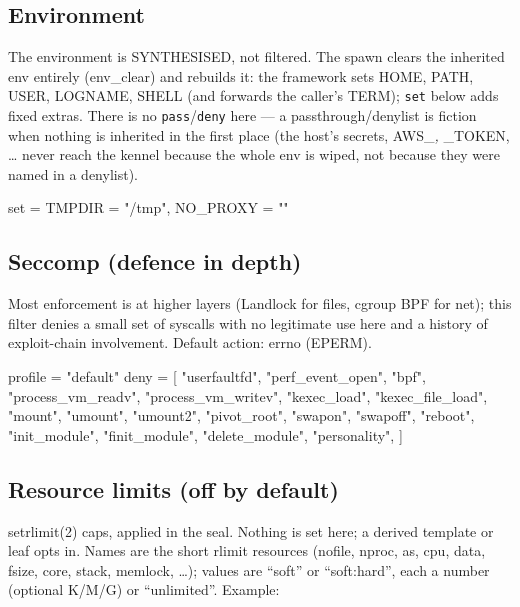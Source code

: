 \hypertarget{environment}{%
\subsection{Environment}\label{environment}}

The environment is SYNTHESISED, not filtered. The spawn clears the
inherited env entirely (env\_clear) and rebuilds it: the framework sets
HOME, PATH, USER, LOGNAME, SHELL (and forwards the caller's TERM);
\texttt{set} below adds fixed extras. There is no
\texttt{pass}/\texttt{deny} here --- a passthrough/denylist is fiction
when nothing is inherited in the first place (the host's secrets,
AWS\_\emph{, }\_TOKEN, \ldots{} never reach the kennel because the whole
env is wiped, not because they were named in a denylist).

\begin{kennelcode}
[env]
set = { TMPDIR = "/tmp", NO_PROXY = "" }
\end{kennelcode}

\hypertarget{seccomp-defence-in-depth}{%
\subsection{Seccomp (defence in depth)}\label{seccomp-defence-in-depth}}

Most enforcement is at higher layers (Landlock for files, cgroup BPF for
net); this filter denies a small set of syscalls with no legitimate use
here and a history of exploit-chain involvement. Default action: errno
(EPERM).

\begin{kennelcode}
[seccomp]
profile = "default"
deny = [
    "userfaultfd", "perf_event_open", "bpf",
    "process_vm_readv", "process_vm_writev",
    "kexec_load", "kexec_file_load",
    "mount", "umount", "umount2", "pivot_root",
    "swapon", "swapoff", "reboot",
    "init_module", "finit_module", "delete_module",
    "personality",
]
\end{kennelcode}

\hypertarget{resource-limits-off-by-default}{%
\subsection{Resource limits (off by
default)}\label{resource-limits-off-by-default}}

setrlimit(2) caps, applied in the seal. Nothing is set here; a derived
template or leaf opts in. Names are the short rlimit resources (nofile,
nproc, as, cpu, data, fsize, core, stack, memlock, \ldots); values are
``soft'' or ``soft:hard'', each a number (optional K/M/G) or
``unlimited''. Example:

